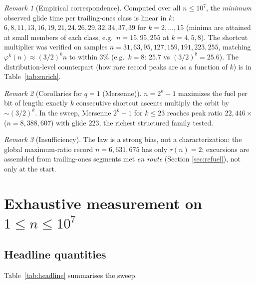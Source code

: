 \documentclass[11pt]{article}
\theoremstyle{remark}
\newtheorem{remark}{Remark}
\begin{document}
\begin{remark}[Empirical correspondence]
\label{rem:empiricalfuel}
Computed over all $n \le 10^7$, the \emph{minimum} observed glide time per
trailing-ones class is linear in $k$: $6, 8, 11, 13, 16, 19, 21, 24, 26,
29, 32, 34, 37, 39$ for $k = 2, \dots, 15$ (minima are attained at small
members of each class, e.g.\ $n = 15, 95, 255$ at $k = 4, 5, 8$). The
shortcut multiplier was verified on
samples $n = 31, 63, 95, 127, 159, 191, 223, 255$, matching
$\varphi^k(n) \approx (3/2)^k n$ to within $3\%$ (e.g.\ $k=8$: $25.7$ vs
$(3/2)^8 = 25.6$). The distribution-level counterpart (how rare record
peaks are as a function of $k$) is in Table~\ref{tab:enrich}.
\end{remark}

\begin{remark}[Corollaries for $q = 1$ (Mersenne)]
$n = 2^k - 1$ maximizes the fuel per bit of length: exactly $k$ consecutive
shortcut ascents multiply the orbit by $\sim (3/2)^k$. In the sweep,
Mersenne $2^k - 1$ for $k \le 23$ reaches peak ratio $22{,}446\times$
($n = 8{,}388{,}607$) with glide $223$, the richest structured family
tested.
\end{remark}

\begin{remark}[Insufficiency]
The law is a strong bias, not a characterization: the global maximum-ratio
record $n = 6{,}631{,}675$ has only $\tau(n) = 2$; excursions are assembled
from trailing-ones segments met \emph{en route} (Section
\ref{sec:refuel}), not only at the start.
\end{remark}

\section{Exhaustive measurement on $1 \le n \le 10^{7}$}
\label{sec:empirical}

\subsection{Headline quantities}
Table~\ref{tab:headline} summarises the sweep.
\end{document}
